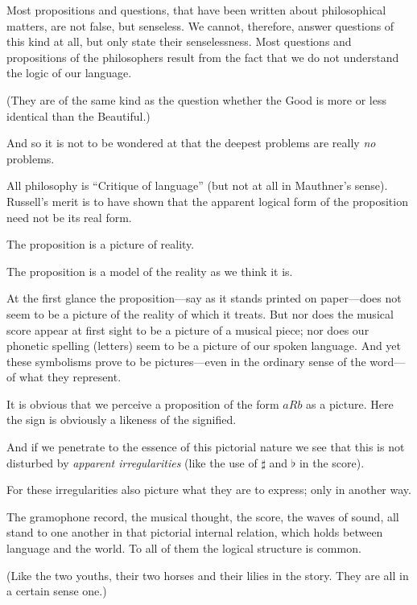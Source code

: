 {Most propositions and questions, that have been
written about philosophical matters, are not false, but
senseless. We cannot, therefore, answer questions
of this kind at all, but only state their senselessness.
Most questions and propositions of the philosophers
result from the fact that we do not understand the
logic of our language.

(They are of the same kind as the question
whether the Good is more or less identical than the
Beautiful.)

And so it is not to be wondered at that the
deepest problems are really \emph{no} problems.}


{All philosophy is ``Critique of language'' (but
not at all in Mauthner's sense). Russell's merit is
to have shown that the apparent logical form of the
proposition need not be its real form.}


{The proposition is a picture of reality.

The proposition is a model of the reality as we
think it is.}


{At the first glance the proposition---say as it
stands printed on paper---does not seem to be a
picture of the reality of which it treats. But nor
does the musical score appear at first sight to be a
picture of a musical piece; nor does our phonetic
spelling (letters) seem to be a picture of our spoken
language. And yet these symbolisms prove to be
pictures---even in the ordinary sense of the word---of
what they represent.}


{It is obvious that we perceive a proposition
of the form $aRb$ as a picture. Here the sign is
obviously a likeness of the signified.}


{And if we penetrate to the essence of this
pictorial nature we see that this is not disturbed
by \emph{apparent irregularities} (like the use of $\sharp$ and $\flat$ in
the score).

For these irregularities also picture what they
are to express; only in another way.}


{The gramophone record, the musical thought,
the score, the waves of sound, all stand to one
another in that pictorial internal relation, which
holds between language and the world. To all of
them the logical structure is common.

(Like the two youths, their two horses and their
lilies in the story. They are all in a certain sense
one.)}


